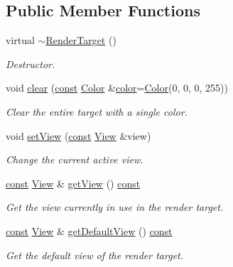 \subsection*{Public Member Functions}
\begin{DoxyCompactItemize}
\item 
virtual \hyperlink{classsf_1_1_render_target_a9abd1654a99fba46f6887b9c625b9b06}{$\sim$\-Render\-Target} ()
\begin{DoxyCompactList}\small\item\em Destructor. \end{DoxyCompactList}\item 
void \hyperlink{classsf_1_1_render_target_a6bb6f0ba348f2b1e2f46114aeaf60f26}{clear} (\hyperlink{term__entry_8h_a57bd63ce7f9a353488880e3de6692d5a}{const} \hyperlink{classsf_1_1_color}{Color} \&\hyperlink{_entity_8cpp_a864889304a90873adb9c6e289a54bcf4}{color}=\hyperlink{classsf_1_1_color}{Color}(0, 0, 0, 255))
\begin{DoxyCompactList}\small\item\em Clear the entire target with a single color. \end{DoxyCompactList}\item 
void \hyperlink{classsf_1_1_render_target_a063db6dd0a14913504af30e50cb6d946}{set\-View} (\hyperlink{term__entry_8h_a57bd63ce7f9a353488880e3de6692d5a}{const} \hyperlink{classsf_1_1_view}{View} \&view)
\begin{DoxyCompactList}\small\item\em Change the current active view. \end{DoxyCompactList}\item 
\hyperlink{term__entry_8h_a57bd63ce7f9a353488880e3de6692d5a}{const} \hyperlink{classsf_1_1_view}{View} \& \hyperlink{classsf_1_1_render_target_a98f721cc6dc11478922427fedfb2288b}{get\-View} () \hyperlink{term__entry_8h_a57bd63ce7f9a353488880e3de6692d5a}{const} 
\begin{DoxyCompactList}\small\item\em Get the view currently in use in the render target. \end{DoxyCompactList}\item 
\hyperlink{term__entry_8h_a57bd63ce7f9a353488880e3de6692d5a}{const} \hyperlink{classsf_1_1_view}{View} \& \hyperlink{classsf_1_1_render_target_a718b1aa6296bf855171699cc18251ced}{get\-Default\-View} () \hyperlink{term__entry_8h_a57bd63ce7f9a353488880e3de6692d5a}{const} 
\begin{DoxyCompactList}\small\item\em Get the default view of the render target. \end{DoxyCompactList}\item 

\end{DoxyCompactItemize}
